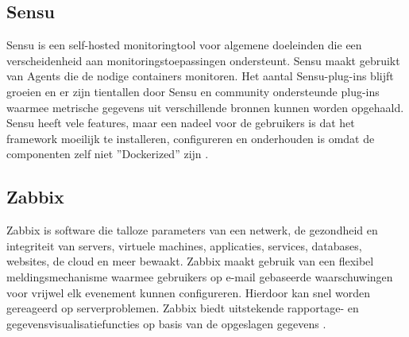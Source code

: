 \subsection{Sensu}

Sensu is een self-hosted monitoringtool voor algemene doeleinden die een verscheidenheid aan monitoringstoepassingen ondersteunt. Sensu maakt gebruikt van Agents die de nodige containers monitoren. Het aantal Sensu-plug-ins blijft groeien en er zijn tientallen door Sensu en community ondersteunde plug-ins waarmee metrische gegevens uit verschillende bronnen kunnen worden opgehaald. Sensu heeft vele features, maar een nadeel voor de gebruikers is dat het framework moeilijk te installeren, configureren en onderhouden is omdat de componenten zelf niet ''Dockerized'' zijn \autocite{Sissons2021}. 

\subsection{Zabbix}

Zabbix is software die talloze parameters van een netwerk, de gezondheid en integriteit van servers, virtuele machines, applicaties, services, databases, websites, de cloud en meer bewaakt. Zabbix maakt gebruik van een flexibel meldingsmechanisme waarmee gebruikers op e-mail gebaseerde waarschuwingen voor vrijwel elk evenement kunnen configureren. Hierdoor kan snel worden gereageerd op serverproblemen. Zabbix biedt uitstekende rapportage- en gegevensvisualisatiefuncties op basis van de opgeslagen gegevens \autocite{Zabbix}. 















